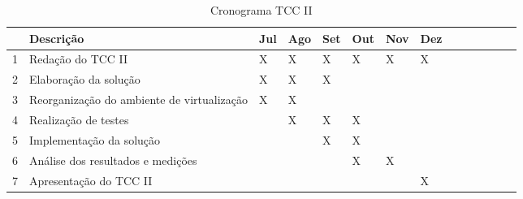 \begin{table}[h!]\normalsize %
\caption {Cronograma TCC II}
\label{tab:implcronograma}
\begin{center}
\def\arraystretch{1}
\setlength{\tabcolsep}{0.15cm}
\begin{tabular}{|l|l|l|l|l|l|l|l|l|l|l|l|l|l|}\hline
 & \textbf{Descrição} & \textbf{Jul} & \textbf{Ago} & \textbf{Set} & \textbf{Out} & \textbf{Nov} & \textbf{Dez} \\\hline
1 & Redação do TCC II & X & X & X & X & X & X \\\hline
2 & Elaboração da solução & X & X & X & & & \\\hline
3 & Reorganização do ambiente de virtualização & X & X & & & & \\\hline
4 & Realização de testes & & X & X & X & & \\\hline
5 & Implementação da solução & & & X & X & & \\\hline
6 & Análise dos resultados e medições & & & & X & X & \\\hline
7 & Apresentação do TCC II & & & & & & X \\\hline
\end{tabular}
\end{center}
\end{table}
